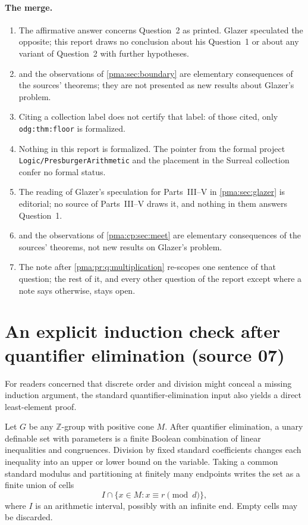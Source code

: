 \documentclass[11pt]{article}
\numberwithin{equation}{section}
\theoremstyle{definition}
\theoremstyle{remark}
\newcommand{\Z}{\mathbb Z}
\newcommand{\replabel}[1]{\nolinkurl{#1}}
\newcommand{\fn}[1]{\nolinkurl{#1}}
\begin{document}
\paragraph{The merge.}
\begin{enumerate}[label=M.\arabic*]
\item The affirmative answer concerns Question~2 as printed. Glazer
speculated the opposite; this report draws no conclusion about his
Question~1 or about any variant of Question~2 with further hypotheses.
\item {} and the observations of \cref{pma:sec:boundary}
are elementary consequences of the sources' theorems; they are not presented
as new results about Glazer's problem.
\item Citing a collection label does not certify that label: of those cited,
only \replabel{odg:thm:floor} is formalized.
\item Nothing in this report is formalized. The pointer from the formal
project \fn{Logic/PresburgerArithmetic} and the placement in the Surreal
collection confer no formal status.
\item The reading of Glazer's speculation for Parts~III--V in
\cref{pma:sec:glazer} is editorial; no source of Parts~III--V draws it, and
nothing in them answers Question~1.
\item {} and the observations of \cref{pma:cp:sec:meet}
are elementary consequences of the sources' theorems, not new results on
Glazer's problem.
\item The note after \cref{pma:pr:q:multiplication} re-scopes one sentence of
that question; the rest of it, and every other question of the report except
where a note says otherwise, stays open.
\end{enumerate}

\section{An explicit induction check after quantifier elimination (source 07)}
\label{pma:cp:app:induction}

For readers concerned that discrete order and division might conceal a
missing induction argument, the standard quantifier-elimination input
also yields a direct least-element proof.

Let $G$ be any $\Z$-group with positive cone $M$. After quantifier
elimination, a unary definable set with parameters is a finite Boolean
combination of linear inequalities and congruences. Division by fixed
standard coefficients changes each inequality into an upper or lower
bound on the variable. Taking a common standard modulus and partitioning
at finitely many endpoints writes the set as a finite union of cells
\[
I\cap\{x\in M:x\equiv r\pmod d\},
\]
where $I$ is an arithmetic interval, possibly with an infinite end.
Empty cells may be discarded.
\end{document}
